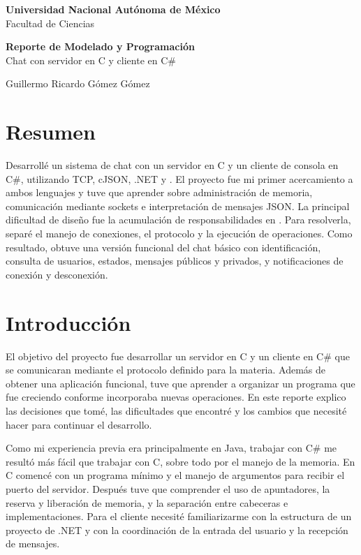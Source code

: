 \documentclass[11pt,letterpaper]{article}
\newcommand{\archivo}[1]{\texttt{\detokenize{#1}}}
\begin{document}
\begin{center}
    \textbf{Universidad Nacional Autónoma de México}\\
    Facultad de Ciencias

    \textbf{Reporte de Modelado y Programación}\\
    Chat con servidor en C y cliente en C\#

    Guillermo Ricardo Gómez Gómez
\end{center}

\section{Resumen}

Desarrollé un sistema de chat con un servidor en C y un cliente de
consola en C\#, utilizando TCP, cJSON, .NET y
\archivo{System.Text.Json}. El proyecto fue mi primer acercamiento
a ambos lenguajes y tuve que aprender sobre administración de memoria,
comunicación mediante sockets e interpretación de mensajes JSON.
La principal dificultad de diseño fue la acumulación de responsabilidades
en \archivo{servidor.c}. Para resolverla, separé el manejo de conexiones,
el protocolo y la ejecución de operaciones. Como resultado, obtuve una
versión funcional del chat básico con identificación, consulta de
usuarios, estados, mensajes públicos y privados, y notificaciones de
conexión y desconexión.

\section{Introducción}

El objetivo del proyecto fue desarrollar un servidor en C y un cliente
en C\# que se comunicaran mediante el protocolo definido para la materia.
Además de obtener una aplicación funcional, tuve que aprender a
organizar un programa que fue creciendo conforme incorporaba nuevas
operaciones. En este reporte explico las decisiones que tomé, las
dificultades que encontré y los cambios que necesité hacer para
continuar el desarrollo.

Como mi experiencia previa era principalmente en Java, trabajar con
C\# me resultó más fácil que trabajar con C, sobre todo por el manejo
de la memoria. En C comencé con un programa mínimo y el manejo de
argumentos para recibir el puerto del servidor. Después tuve que
comprender el uso de apuntadores, la reserva y liberación de memoria,
y la separación entre cabeceras e implementaciones. Para el cliente
necesité familiarizarme con la estructura de un proyecto de .NET y
con la coordinación de la entrada del usuario y la recepción de
mensajes.
\end{document}
